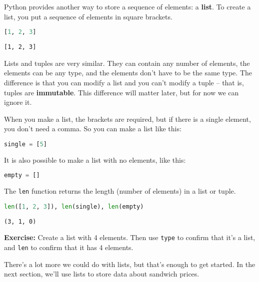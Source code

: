 Python provides another way to store a sequence of elements: a
\textbf{list}. To create a list, you put a sequence of elements in
square brackets.

\begin{lstlisting}[language=Python,style=source]
[1, 2, 3]
\end{lstlisting}

\begin{lstlisting}[style=output]
[1, 2, 3]
\end{lstlisting}

Lists and tuples are very similar. They can contain any number of
elements, the elements can be any type, and the elements don't have to
be the same type. The difference is that you can modify a list and you
can't modify a tuple -- that is, tuples are \textbf{immutable}. This
difference will matter later, but for now we can ignore it.

When you make a list, the brackets are required, but if there is a
single element, you don't need a comma. So you can make a list like
this:

\begin{lstlisting}[language=Python,style=source]
single = [5]
\end{lstlisting}

It is also possible to make a list with no elements, like this:

\begin{lstlisting}[language=Python,style=source]
empty = []
\end{lstlisting}

The \passthrough{\lstinline!len!} function returns the length (number of
elements) in a list or tuple.

\begin{lstlisting}[language=Python,style=source]
len([1, 2, 3]), len(single), len(empty)
\end{lstlisting}

\begin{lstlisting}[style=output]
(3, 1, 0)
\end{lstlisting}

\textbf{Exercise:} Create a list with 4 elements. Then use
\passthrough{\lstinline!type!} to confirm that it's a list, and
\passthrough{\lstinline!len!} to confirm that it has 4 elements.

There's a lot more we could do with lists, but that's enough to get
started. In the next section, we'll use lists to store data about
sandwich prices.

